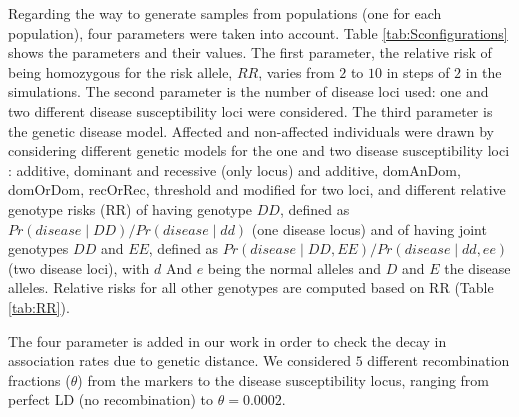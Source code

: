 \documentclass[runningheads]{/home/mabad/conferences/LNCS/llncs}
\begin{document}
Regarding the way to generate samples from populations (one for each population), four parameters  were taken into account. Table \ref{tab:Sconfigurations} shows the parameters and their values. The first parameter, the relative risk of being homozygous for the risk allele, $RR$, varies from $2$ to $10$ in steps of $2$ in the simulations. The second parameter is the number of disease loci used: one and two different disease susceptibility loci were considered. The third parameter is the genetic disease model. Affected and non-affected individuals were drawn by considering different genetic models for the one and two disease susceptibility loci \cite{Yu.zz.2005}: additive, dominant and recessive (only locus) and additive, domAnDom, domOrDom, recOrRec, threshold and modified for two loci, and different relative genotype risks (RR) of having genotype $DD$, defined as $Pr(disease\mid DD)/Pr(disease\mid dd)$ (one disease locus) and of having joint genotypes $DD$ and $EE$, defined as $Pr(disease\mid DD,EE)/Pr(disease\mid dd,ee)$ (two disease loci), with $d$ And $e$ being the normal alleles and $D$ and $E$ the disease alleles. Relative risks for all other genotypes are computed based on RR \cite{Fan.zz.2001,Yu.zz.2005} (Table \ref{tab:RR}).


The four parameter is added in our work in order to check the decay in association rates due to genetic distance. We considered $5$ different recombination fractions ($\theta$) from the markers to the disease susceptibility locus, ranging from perfect LD (no recombination) to $\theta=0.0002$.
\end{document}
